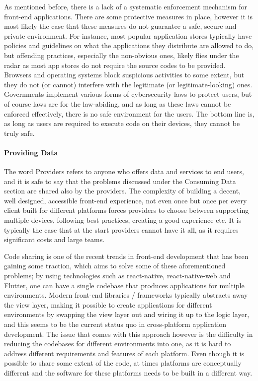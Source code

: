 As mentioned before, there is a lack of a systematic enforcement mechanism for front-end applications. There are some protective measures in place, however it is most likely the case that these measures do not guarantee a safe, secure and private environment. For instance, most popular application stores typically have policies and guidelines on what the applications they distribute are allowed to do, but offending practices, especially the non-obvious ones, likely flies under the radar as most app stores do not require the source codes to be provided. Browsers and operating systems block suspicious activities to some extent, but they do not (or cannot) interfere with the legitimate (or legitimate-looking) ones. Governments implement various forms of cybersecurity laws to protect users, but of course laws are for the law-abiding, and as long as these laws cannot be enforced effectively, there is no safe environment for the users. The bottom line is, as long as users are required to execute code on their devices, they cannot be truly safe.

\paragraph{Providing Data}

The word Providers refers to anyone who offers data and services to end users, and it is safe to say that the problems discussed under the Consuming Data section are shared also by the providers. The complexity of building a decent, well designed, accessible front-end experience, not even once but once per every client built for different platforms forces providers to choose between supporting multiple devices, following best practices, creating a good experience etc. It is typically the case that at the start providers cannot have it all, as it requires significant costs and large teams. 

Code sharing is one of the recent trends in front-end development that has been gaining some traction, which aims to solve some of these aforementioned problems; by using technologies such as react-native, react-native-web and Flutter, one can have a single codebase that produces applications for multiple environments. Modern front-end libraries / frameworks typically abstracts away the view layer, making it possible to create applications for different environments by swapping the view layer out and wiring it up to the logic layer, and this seems to be the current status quo in cross-platform application development. The issue that comes with this approach however is the difficulty in reducing the codebases for different environments into one, as it is hard to address different requirements and features of each platform. Even though it is possible to share some extent of the code, at times platforms are conceptually different and the software for these platforms needs to be built in a different way. 

